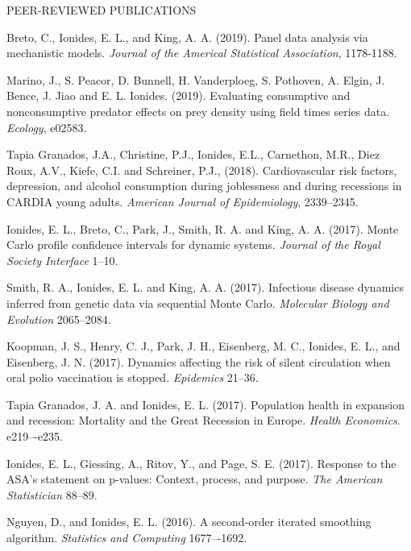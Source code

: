 \begin{reflist}{PEER-REVIEWED PUBLICATIONS}
\item Breto, C., Ionides, E. L., and King, A. A. (2019). Panel data analysis via mechanistic models. {\it Journal of the Americal Statistical Association}, {}{\separator}1178-1188.

\item Marino, J., S. Peacor, D. Bunnell, H. Vanderploeg, S. Pothoven, A. Elgin, J. Bence, J. Jiao and E. L. Ionides. (2019). Evaluating consumptive and nonconsumptive predator effects on prey density using field times series data. {\it Ecology}, {}{\separator}e02583.

\item Tapia Granados, J.A., Christine, P.J., Ionides, E.L., Carnethon, M.R., Diez Roux, A.V., Kiefe, C.I. and Schreiner, P.J., (2018). Cardiovascular risk factors, depression, and alcohol consumption during joblessness and during recessions in CARDIA young adults. 
  {\it American Journal of Epidemiology}, {}{\separator}2339--2345.

\item Ionides, E. L., Breto, C., Park, J., Smith, R. A. and King, A. A. (2017). Monte Carlo profile confidence intervals for dynamic systems. {\it Journal of the Royal Society Interface} {}{\separator}1--10.

\item Smith, R. A., Ionides, E. L. and King, A. A. (2017). Infectious disease dynamics inferred from genetic data via sequential Monte Carlo. {\it Molecular Biology and Evolution} {}{\separator}2065--2084.

\item Koopman, J. S., Henry, C. J., Park, J. H., Eisenberg, M. C., Ionides, E. L., and Eisenberg, J. N. (2017). Dynamics affecting the risk of silent circulation when oral polio vaccination is stopped. {\it Epidemics} {}{\separator}21--36. 

\item Tapia Granados, J. A. and Ionides, E. L. (2017). Population health in expansion and recession: Mortality and the Great Recession in Europe. {\it Health Economics}. {}{\separator}e219–-e235.

\item Ionides, E. L., Giessing, A., Ritov, Y., and Page, S. E. (2017).
Response to the ASA's statement on p-values: Context, process, and purpose. {\em The American Statistician} {}{\separator}88--89.

\item Nguyen, D., and Ionides, E. L. (2016). A second-order iterated smoothing algorithm. {\em Statistics and Computing} {}{\separator}1677–-1692.


\end{reflist}
